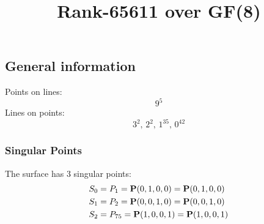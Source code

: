 \documentclass{article}
\newcommand\setTBstruts{\def\T{\rule{0pt}{2.6ex}}%
\def\B{\rule[-1.2ex]{0pt}{0pt}}}
\newcommand{\bP}{{\bf P}}
\begin{document}
 
\setTBstruts



{\allowdisplaybreaks%






\title{Rank-65611 over GF(8)}
\author{}%
\maketitle%
%
{}



\subsection*{General information}
Points on lines:
$$
9^5$$
Lines on points:
$$
3^2,\,2^2,\,1^{35},\,0^{42}$$
\subsubsection*{Singular Points}
The surface has 3 singular points:\\
\begin{align*}
S_{0} &= P_{1}=\bP(0, 1, 0, 0) = \bP(0, 1, 0, 0)\\
S_{1} &= P_{2}=\bP(0, 0, 1, 0) = \bP(0, 0, 1, 0)\\
S_{2} &= P_{75}=\bP(1, 0, 0, 1) = \bP(1, 0, 0, 1)\\
\end{align*}
}
\end{document}
